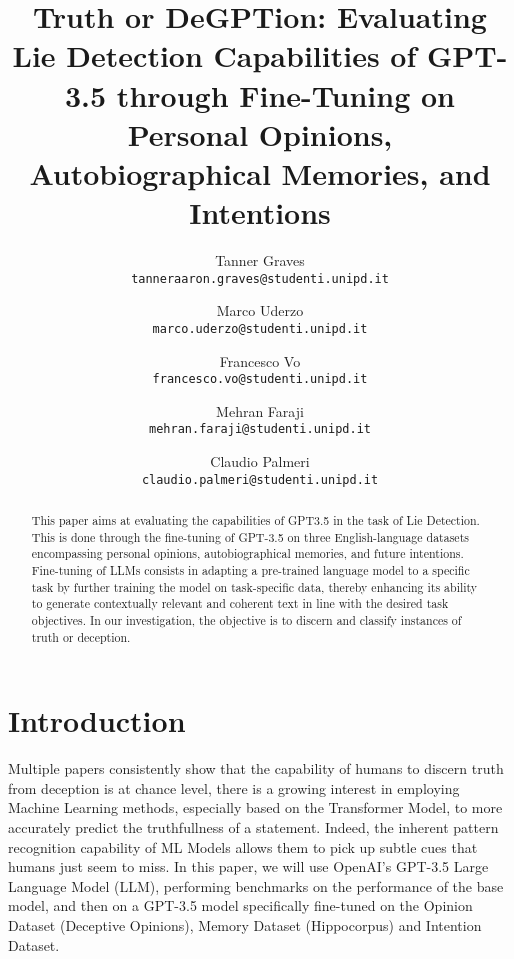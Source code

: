 \documentclass[10pt,twocolumn,letterpaper]{article}
\begin{document}
\title{Truth or DeGPTion: Evaluating Lie Detection Capabilities of GPT-3.5 through Fine-Tuning on Personal Opinions, Autobiographical Memories, and Intentions}


\author{
Tanner Graves\\
{\tt\small tanneraaron.graves@studenti.unipd.it}
\and
Marco Uderzo\\
{\tt\small marco.uderzo@studenti.unipd.it}
\and
Francesco Vo \\
{\tt\small francesco.vo@studenti.unipd.it}
\and
Mehran Faraji\\
{\tt\small mehran.faraji@studenti.unipd.it}
\and
Claudio Palmeri \\
{\tt\small claudio.palmeri@studenti.unipd.it}
}

\maketitle


\begin{abstract}
This paper aims at evaluating the capabilities of GPT3.5 in the task of Lie Detection.
This is done through the fine-tuning of GPT-3.5 on three English-language datasets encompassing 
personal opinions, autobiographical memories, and future intentions. 
Fine-tuning of LLMs consists in adapting a pre-trained language model to a specific 
task by further training the model on task-specific data, thereby 
enhancing its ability to generate contextually relevant and coherent text in 
line with the desired task objectives. In our investigation, the objective is to 
discern and classify instances of truth or deception.

\end{abstract}

\section{Introduction}
Multiple papers consistently show that the capability of humans to discern truth from deception
is at chance level, there is a growing interest in employing Machine Learning methods, especially
based on the Transformer Model, to more accurately predict the truthfullness of a statement.
Indeed, the inherent pattern recognition capability of ML Models allows them to pick up subtle cues
that humans just seem to miss. In this paper, we will use OpenAI's GPT-3.5 Large Language Model (LLM),
performing benchmarks on the performance of the base model, and then on a GPT-3.5 model specifically
fine-tuned on the Opinion Dataset (Deceptive Opinions), Memory Dataset (Hippocorpus) and Intention Dataset.
\end{document}
